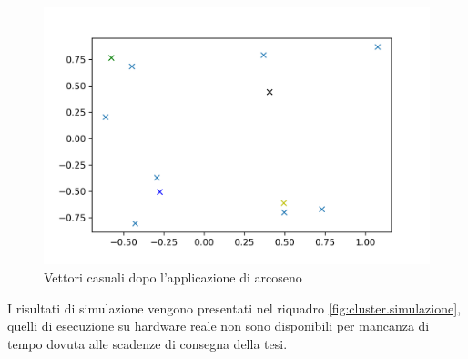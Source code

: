 \begin{figure}[h!]
    \centering
    \includegraphics[width=\textwidth]{gfx/cluster/random}
    \caption{Vettori casuali dopo l'applicazione di arcoseno}
    \label{fig:random}
\end{figure}

I risultati di simulazione vengono presentati nel riquadro \ref{fig:cluster.simulazione}, 
quelli di esecuzione su hardware reale non sono disponibili per mancanza di tempo 
dovuta alle scadenze di consegna della tesi. 

